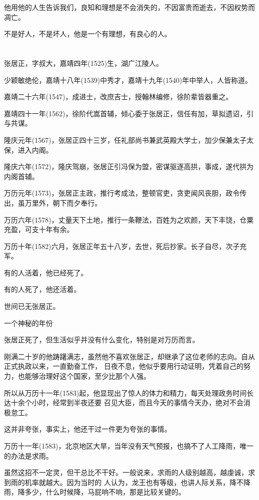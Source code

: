 \documentclass[11pt,a4paper,onecolumn]{article}
\begin{document}
他用他的人生告诉我们，良知和理想是不会消失的，不因富贵而逝去，不因权势而凋亡。

不是好人，不是坏人，他是一个有理想，有良心的人。

\section[\thesection]{}

张居正，字叔大，嘉靖四年(1525)生，湖广江陵人。

少颖敏绝伦，嘉靖十八年(1539)中秀才，嘉靖十九年(1540)年中举人，人皆称道。

嘉靖二十六年(1547)，成进士，改庶吉士，授翰林编修，徐阶辈皆器重之。

嘉靖四十一年(1562)，徐阶代嵩首辅，倾心委于张居正，信任有加，草拟遗诏，引与共谋。

隆庆元年(1567)，张居正四十三岁，任礼部尚书兼武英殿大学士，加少保兼太子太保，进入内阁。

隆庆六年(1572)，隆庆驾崩，张居正引冯保为盟，密谋驱逐高拱，事成，遂代拱为内阁首辅。

万历元年(1573)，张居正主政，推行考成法，整顿官吏，贪吏闻风丧胆，政令传出，虽万里外，朝下而夕奉行。

万历六年(1578)，丈量天下土地，推行一条鞭法，百姓为之欢颜，天下丰饶，仓粟充盈，可支十年有余。

万历十年(1582)六月，张居正年五十八岁，去世，死后抄家。长子自尽，次子充军。

有的人活着，他已经死了。

有的人死了，他还活着。

世间已无张居正。

一个神秘的年份

张居正死了，但生活似乎并没有什么变化，特别是对万历而言。

刚满二十岁的他踌躇满志，虽然他不喜欢张居正，却继承了这位老师的志向。自从正式执政以来，一直勤奋工作，
日夜不息，他似乎要用行动证明，凭着自己的努力，也能够治理好这个国家，至少比那个人强。

所以从万历十一年(1583)起，他显现出了惊人的体力和精力，每天处理政务时间长达十余个小时，经常到半夜还要
召见大臣，而且今天的事情今天办，绝对不会消极怠工。

这并非夸张，事实上，他还干过一件更为夸张的事情。

万历十一年(1583)，北京地区大旱，当年没有天气预报，也搞不了人工降雨，唯一的办法是求雨。

虽然这招不一定灵，但干总比不干好。一般说来，求雨的人级别越高，越虔诚，求到雨的机率就越大。因为当时的
人认为，龙王也有等级，也讲人际关系，降不降雨，降多少，什么时候降，马屁响不响，那是比较关键的。
\end{document}
